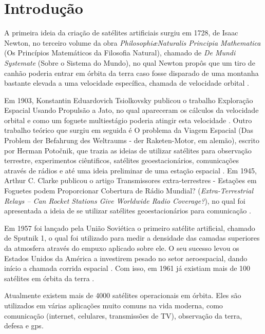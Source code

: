 \chapter{Introdução}

A primeira ideia da criação de satélites artificiais surgiu em 1728, de Isaac Newton, no terceiro volume da obra \textit{Philosophi\ae Naturalis Principia Mathematica} (Os Princípios Matemáticos da Filosofia Natural), chamado de \textit{De Mundi Systemate} (Sobre o Sistema do Mundo), no qual Newton propôs que um tiro de canhão poderia entrar em órbita da terra caso fosse disparado de uma montanha bastante elevada a uma velocidade específica, chamada de velocidade orbital \cite{newton1728}.

Em 1903, Konstantin Eduardovich Tsiolkovsky publicou o trabalho Exploração Espacial Usando Propulsão a Jato, no qual apareceram os cálculos da velocidade orbital e como um foguete multiestágio poderia atingir esta velocidade \cite{maul2012}. Outro trabalho teórico que surgiu em seguida é O problema da Viagem Espacial (Das Problem der Befahrung des Weltraums - der Raketen-Motor, em alemão), escrito por Herman Poto\v{c}nik, que trazia as ideias de utilizar satélites para observação terrestre, experimentos ciêntificos, satélites geoestacionários, comunicações através de rádios e até uma ideia preliminar de uma estação espacial \cite{potocnik1929}. Em 1945, Arthur C. Clarke publicou o artigo Transmissores extra-terrestres - Estações em Foguetes podem Proporcionar Cobertura de Rádio Mundial? (\textit{Extra-Terrestrial Relays – Can Rocket Stations Give Worldwide Radio Coverage?}), no qual foi apresentada a ideia de se utilizar satélites geoestacionários para comunicação \cite{Clarke1945}.

Em 1957 foi lançado pela União Soviética o primeiro satélite artificial, chamado de Sputnik 1, o qual foi utilizado para medir a densidade das camadas superiores da atmosfera através do empuxo aplicado sobre ele. O seu sucesso levou os Estados Unidos da América a investirem pesado no setor aeroespacial, dando início a chamada corrida espacial \cite{McQuaid2017}. Com isso, em 1961 já existiam mais de 100 satélites em órbita da terra \cite{Portree1999}.

Atualmente existem mais de 4000 satélites operacionais em órbita. Eles são utilizados em várias aplicações muito comuns na vida moderna, como comunicação (internet, celulares, transmissões de TV), observação da terra, defesa e \gls{gps}\cite{spaceObjectsIndex2017}.

